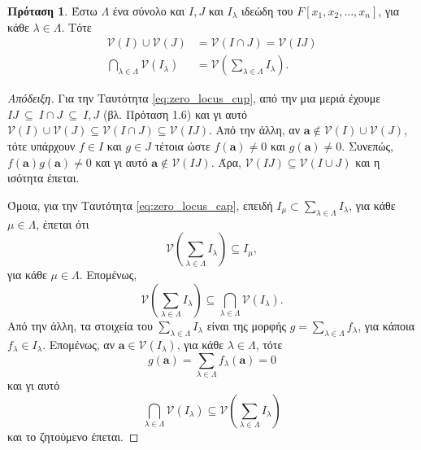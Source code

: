 \documentclass[12pt,a4paper,reqno]{amsart}
\theoremstyle{definition}
\newtheorem{proposition}[theorem]{Πρόταση}
\theoremstyle{remark}
\numberwithin{theorem}{section}
\numberwithin{exercise}{section}
\numberwithin{equation}{section}
\newcommand{\vV}{\mathcal{V}}
\newcommand{\bfa}{\pmb{a}}
\newcommand{\Pol}[1]{F[x_1, x_2, \dots, x_{#1}]}
\begin{document}
\begin{proposition}
    \label{prop:zero_locus}
    Έστω $\Lambda$ ένα σύνολο και $I, J$ και $I_\lambda$ ιδεώδη του $\Pol{n}$, για κάθε $\lambda \in \Lambda$. Τότε 
    \begin{align}
        \vV(I) \cup \vV(J) &= \vV(I\cap{J}) = \vV(IJ) \label{eq:zero_locus_cup} \\
        \bigcap_{\lambda \in \Lambda}\vV(I_\lambda) &= \vV\left(
            \sum_{\lambda \in \Lambda} I_\lambda
        \right). \label{eq:zero_locus_cap}
    \end{align}
\end{proposition}

\begin{proof}[Απόδειξη]
    Για την Ταυτότητα \eqref{eq:zero_locus_cup}, από την μια μεριά έχουμε $
    IJ \ \subseteq \ I\cap{J} \ \subseteq \ I, J$ (βλ. Πρόταση 1.6) και γι αυτό $\vV(I) \cup \vV(J) \subseteq \vV(I\cap{J}) \subseteq \vV(IJ)$.
    Από την άλλη, αν $\bfa \notin \vV(I) \cup \vV(J)$, τότε υπάρχουν $f \in I$ και $g \in J$ τέτοια ώστε $f(\bfa) \neq 0$ και $g(\bfa) \neq 0$. Συνεπώς, $f(\bfa)g(\bfa) \neq 0$ και γι αυτό $\bfa \notin \vV(IJ)$. Άρα, $\vV(IJ) \subseteq \vV(I\cup J)$ και η ισότητα έπεται.

    Όμοια, για την Ταυτότητα \eqref{eq:zero_locus_cap}, επειδή $I_\mu \subset \sum_{\lambda \in \Lambda} I_\lambda$, για κάθε $\mu \in \Lambda$, έπεται ότι 
    \[     
    \vV\left(
            \sum_{\lambda \in \Lambda} I_\lambda
        \right)\subseteq I_\mu,
    \] 
    για κάθε $\mu \in \Lambda$. Επομένως, 
    \[
    \vV\left(
            \sum_{\lambda \in \Lambda} I_\lambda
        \right) \subseteq \bigcap_{\lambda \in \Lambda}\vV(I_\lambda).
    \]
    Από την άλλη, τα στοιχεία του $\sum_{\lambda \in \Lambda}I_\lambda$ είναι της μορφής $g = \sum_{\lambda \in \Lambda} f_\lambda$, για κάποια $f_\lambda \in I_\lambda$. Επομένως, αν $\bfa \in \vV(I_\lambda)$, για κάθε $\lambda \in \Lambda$, τότε 
    \[
    g(\bfa) = \sum_{\lambda \in \Lambda} f_\lambda(\bfa) = 0
    \]
    και γι αυτό 
    \[
    \bigcap_{\lambda \in \Lambda}\vV(I_\lambda) \subseteq \vV\left(
            \sum_{\lambda \in \Lambda} I_\lambda
        \right)
    \]
    και το ζητούμενο έπεται.
\end{proof}
\end{document}
